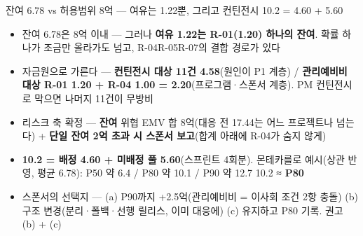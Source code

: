 \begin{frame}{잔여 6.78 vs 허용범위 8억 — 여유는 1.22뿐, 그리고 컨틴전시 10.2 = 4.60 + 5.60}
\begin{itemize}
\item 잔여 6.78은 8억 이내 — 그러나 \textbf{여유 1.22는 R-01(1.20) 하나의 잔여}. 확률 하나가 조금만 올라가도 넘고, R-04\ra{}R-05\ra{}R-07의 결합 경로가 있다
\item 자금원으로 가른다 — \textbf{컨틴전시 대상 11건 4.58}(원인이 P1 계층) / \textbf{관리예비비 대상 R-01 1.20 + R-04 1.00 = 2.20}(프로그램·스폰서 계층). PM 컨틴전시로 막으면 나머지 11건이 무방비
\item 리스크 축 확정 — \textbf{잔여} 위협 EMV 합 8억(대응 전 17.44는 어느 프로젝트나 넘는다) + \textbf{단일 잔여 2억 초과 시 스폰서 보고}(합계 아래에 R-04가 숨지 않게)
\item \textbf{10.2 = 배정 4.60 + 미배정 풀 5.60}(스프린트 4회분). 몬테카를로 예시(상관 반영, 평균 6.78): P50 약 6.4 / P80 약 10.1 / P90 약 12.7 \ra{} 10.2 ≈ \textbf{P80}
\item 스폰서의 선택지 — (a) P90까지 +2.5억(관리예비비 = 이사회 조건 2항 충돌) (b) 구조 변경(분리·폴백·선행 릴리스, 이미 대응에) (c) 유지하고 P80 기록. 권고 (b) + (c)
\end{itemize}
\end{frame}

